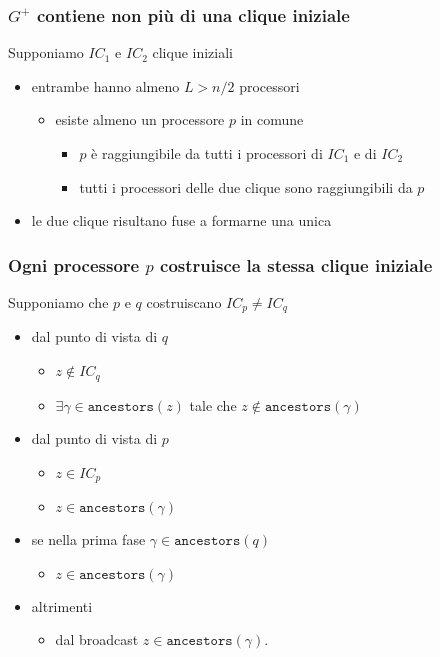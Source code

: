 \documentclass{beamer}
\begin{document}
\begin{frame}\frametitle{$G^+$ contiene non più di una clique iniziale}
Supponiamo $IC_1$ e $IC_2$ clique iniziali
\begin{itemize}
\item entrambe hanno almeno $L>n/2$ processori
\begin{itemize}
\item esiste almeno un processore $p$ in comune
\begin{itemize}
\item $p$ è raggiungibile da tutti i processori di $IC_1$ e di $IC_2$
\item tutti i processori delle due clique sono raggiungibili da $p$
\end{itemize}
\end{itemize}
\item le due clique risultano fuse a formarne una unica
\end{itemize}
\begin{figure}\centering\end{figure}
\end{frame}

\begin{frame}\frametitle{Ogni processore $p$ costruisce la stessa clique iniziale}
Supponiamo che $p$ e $q$ costruiscano $IC_p\neq IC_q$
\begin{itemize}
\item dal punto di vista di $q$
\begin{itemize}
\item $z\not\in IC_q$
\item $\exists \gamma \in \texttt{ancestors}(z)$ tale che $z \not \in \texttt{ancestors}(\gamma)$
\end{itemize}
\item dal punto di vista di $p$
\begin{itemize}
\item $z\in IC_p$
\item $z \in \texttt{ancestors}(\gamma)$
\end{itemize}
\end{itemize}
\begin{itemize}
\item se nella prima fase $\gamma\in\texttt{ancestors}(q)$ 
\begin{itemize}
\item $z \in\texttt{ancestors}(\gamma)$
\end{itemize}
\item altrimenti
\begin{itemize}
\item dal broadcast  $z\in\texttt{ancestors}(\gamma)$.
\end{itemize}
\end{itemize}
\begin{figure}\centering\end{figure}
\end{frame}
\end{document}
